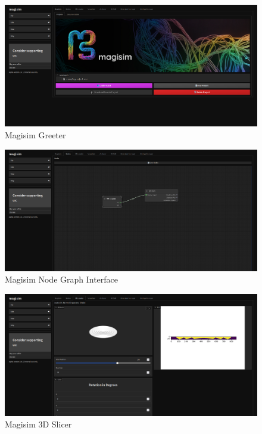 \documentclass[11pt, a4paper, titlepage]{article}
\begin{document}
\newpage
{} 
\printbibliography

\newpage
\appendix
\appendixpage
\addappheadtotoc

\begin{figure}[h]
	\includegraphics[width=\textwidth]{magisim-screenshot-0001.png}
	\caption{Magisim Greeter}
	\label{fig:magisimgreeter}
\end{figure}
\begin{figure}[h]
	\includegraphics[width=\textwidth]{magisim-screenshot-0002.png}
	\caption{Magisim Node Graph Interface}
	\label{fig:magisimnodegraph}
\end{figure}
\newpage
\begin{figure}[h]
	\includegraphics[width=\textwidth]{magisim-screenshot-0003.png}
	\caption{Magisim 3D Slicer}
	\label{fig:magisimstl}
\end{figure}
\end{document}
